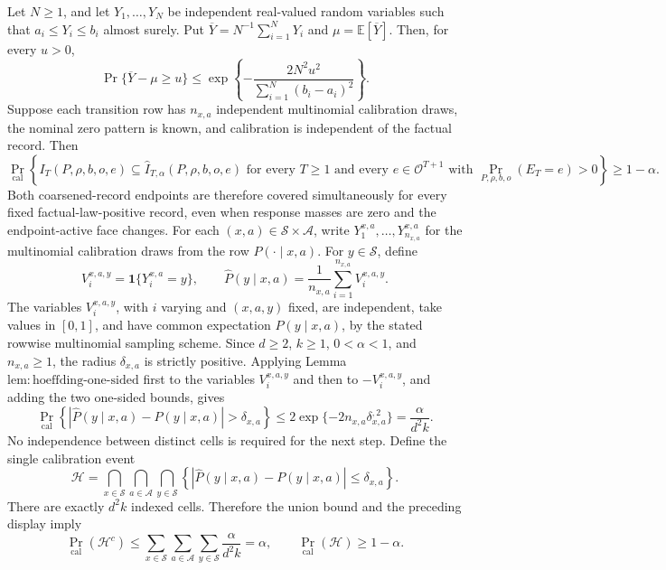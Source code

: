 Let \(N\ge 1\), and let \(Y_1,\ldots,Y_N\) be independent real-valued random variables such that \(a_i\le Y_i\le b_i\) almost surely.  Put \(\overline Y=N^{-1}\sum_{i=1}^N Y_i\) and \(\mu=\mathbb E[\overline Y]\).  Then, for every \(u>0\),
\[
 \Pr\{\overline Y-\mu\ge u\}
 \le
 \exp\!\left\{-\frac{2N^2u^2}{\sum_{i=1}^N(b_i-a_i)^2}\right\}.
\]
Suppose each transition row has \(n_{x,a}\) independent multinomial calibration draws, the nominal zero pattern is known, and calibration is independent of the factual record. Then
\[
\Pr_{\mathrm{cal}}\left\{I_T(P,\rho,b,o,e)\subseteq\widehat I_{T,\alpha}(P,\rho,b,o,e)\text{ for every }T\ge1\text{ and every }e\in\mathcal O^{T+1}\text{ with }\Pr_{P,\rho,b,o}(E_T=e)>0\right\}\ge1-\alpha.
\]
Both coarsened-record endpoints are therefore covered simultaneously for every fixed factual-law-positive record, even when response masses are zero and the endpoint-active face changes.
For each \((x,a)\in\mathcal S\times\mathcal A\), write \(Y^{x,a}_1,\ldots,Y^{x,a}_{n_{x,a}}\) for the multinomial calibration draws from the row \(P(\cdot\mid x,a)\).  For \(y\in\mathcal S\), define
\[
 V^{x,a,y}_i=\mathbf 1\{Y^{x,a}_i=y\},
 \qquad
 \widehat P(y\mid x,a)=\frac{1}{n_{x,a}}\sum_{i=1}^{n_{x,a}}V^{x,a,y}_i.
\]
The variables \(V^{x,a,y}_i\), with \(i\) varying and \((x,a,y)\) fixed, are independent, take values in \([0,1]\), and have common expectation \(P(y\mid x,a)\), by the stated rowwise multinomial sampling scheme.  Since \(d\ge2\), \(k\ge1\), \(0<\alpha<1\), and \(n_{x,a}\ge1\), the radius \(\delta_{x,a}\) is strictly positive.  Applying Lemma \(\mathrm{lem:hoeffding\mbox{-}one\mbox{-}sided}\) first to the variables \(V^{x,a,y}_i\) and then to \(-V^{x,a,y}_i\), and adding the two one-sided bounds, gives
\[
 \Pr_{\mathrm{cal}}\!\left\{
 \left|\widehat P(y\mid x,a)-P(y\mid x,a)\right|>\delta_{x,a}
 \right\}
 \le 2\exp\{-2n_{x,a}\delta_{x,a}^{,2}\}
 =\frac{\alpha}{d^2k}.
\]
No independence between distinct cells is required for the next step.  Define the single calibration event
\[
 \mathcal H=
 \bigcap_{x\in\mathcal S}\bigcap_{a\in\mathcal A}\bigcap_{y\in\mathcal S}
 \left\{
 \left|\widehat P(y\mid x,a)-P(y\mid x,a)\right|\le\delta_{x,a}
 \right\}.
\]
There are exactly \(d^2k\) indexed cells.  Therefore the union bound and the preceding display imply
\[
 \Pr_{\mathrm{cal}}(\mathcal H^c)
 \le
 \sum_{x\in\mathcal S}\sum_{a\in\mathcal A}\sum_{y\in\mathcal S}
 \frac{\alpha}{d^2k}
 =\alpha,
 \qquad
 \Pr_{\mathrm{cal}}(\mathcal H)\ge1-\alpha.
\]


